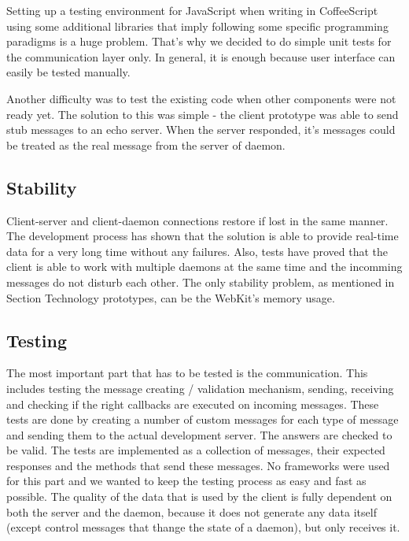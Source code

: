 \documentclass{l3proj}
\begin{document}
Setting up a testing environment for JavaScript when writing in CoffeeScript using some additional libraries that imply following some specific programming paradigms is a huge problem. That's why we decided to do simple unit tests for the communication layer only. In general, it is enough because user interface can easily be tested manually.

Another difficulty was to test the existing code when other components were not ready yet. The solution to this was simple - the client prototype was able to send stub messages to an echo server. When the server responded, it's messages could be treated as the real message from the server of daemon.


\subsection{Stability}

Client-server and client-daemon connections restore if lost in the same manner. The development process has shown that the solution is able to provide real-time data for a very long time without any failures. Also, tests have proved that the client is able to work with multiple daemons at the same time and the incomming messages do not disturb each other. The only stability problem, as mentioned in Section Technology prototypes, can be the WebKit's memory usage.

\subsection{Testing}

The most important part that has to be tested is the communication. This includes testing the message creating / validation mechanism, sending, receiving and checking if the right callbacks are executed on incoming messages. These tests are done by creating a number of custom messages for each type of message and sending them to the actual development server. The answers are checked to be valid. The tests are implemented as a collection of messages, their expected responses and the methods that send these messages. No frameworks were used for this part and we wanted to keep the testing process as easy and fast as possible. The quality of the data that is used by the client is fully dependent on both the server and the daemon, because it does not generate any data itself (except control messages that thange the state of a daemon), but only receives it.


\end{document}
